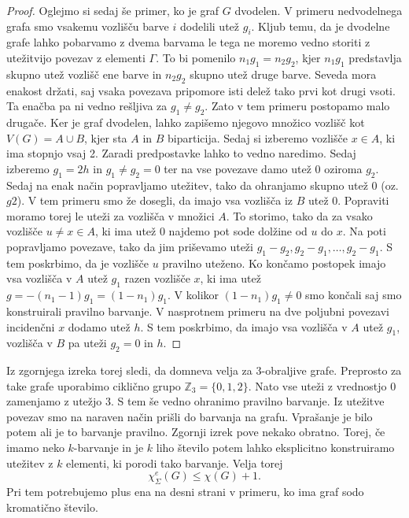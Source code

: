 \documentclass[12pt,a4paper,twoside]{article}
\theoremstyle{definition} %
\theoremstyle{plain} %
\newcommand{\ec}{\chi_{\Sigma}^e}
\numberwithin{equation}{section}  %
\begin{document}
\begin{proof}
	Oglejmo si sedaj še primer, ko je graf $G$ dvodelen. V primeru nedvodelnega grafa smo vsakemu vozlišču barve $i$ dodelili utež $g_i$. Kljub temu, da je dvodelne grafe lahko pobarvamo z dvema barvama le tega ne moremo vedno storiti z utežitvijo povezav z elementi $\Gamma$. To bi pomenilo $n_1 g_1 = n_2 g_2$, kjer $n_1 g_1$ predstavlja skupno utež vozlišč ene barve in $n_2 g_2$ skupno utež druge barve. Seveda mora enakost držati, saj vsaka povezava pripomore isti delež tako prvi kot drugi vsoti. Ta enačba pa ni vedno rešljiva za $g_1 \neq g_2$. Zato v tem primeru postopamo malo drugače. Ker je graf dvodelen, lahko zapišemo njegovo množico vozlišč kot $V(G) = A \cup B$, kjer sta $A$ in $B$ biparticija. Sedaj si izberemo vozlišče $x \in A$, ki ima stopnjo vsaj 2. Zaradi predpostavke lahko to vedno naredimo. Sedaj izberemo $g_1 = 2h$ in $g_1 \neq g_2 = 0$ ter na vse povezave damo utež 0 oziroma $g_2$. Sedaj na enak način popravljamo utežitev, tako da ohranjamo skupno utež 0 (oz. $g2$). V tem primeru smo že dosegli, da imajo vsa vozlišča iz $B$ utež 0. Popraviti moramo torej le uteži za vozlišča v množici $A$. To storimo, tako da za vsako vozlišče $u \neq x \in A$, ki ima utež 0 najdemo pot sode dolžine od $u$ do $x$. Na poti popravljamo povezave, tako da jim priševamo uteži $g_1 - g_2, g_2 - g_1, \ldots, g_2 - g_1$. S tem poskrbimo, da je vozlišče $u$ pravilno uteženo. Ko končamo postopek imajo vsa vozlišča v $A$ utež $g_1$ razen vozlišče $x$, ki ima utež $g = -(n_1 - 1) g_1 = (1 - n_1) g_1$. V kolikor $(1 - n_1)g_1 \neq 0$ smo končali saj smo konstruirali pravilno barvanje. V nasprotnem primeru na dve poljubni povezavi incidenčni $x$ dodamo utež $h$. S tem poskrbimo, da imajo vsa vozlišča v $A$ utež $g_1$, vozlišča v $B$ pa uteži $g_2 = 0$ in $h$.
\end{proof}

Iz zgornjega izreka torej sledi, da domneva velja za $3$-obraljive grafe. Preprosto za take grafe uporabimo ciklično grupo $\mathbb{Z}_3 = \{0,1,2\}$. Nato vse uteži z vrednostjo $0$ zamenjamo z utežjo $3$. S tem še vedno ohranimo pravilno barvanje. Iz utežitve povezav smo na naraven način prišli do barvanja na grafu. Vprašanje je bilo potem ali je to barvanje pravilno. Zgornji izrek pove nekako obratno. Torej, če imamo neko $k$-barvanje in je $k$ liho število potem lahko eksplicitno konstruiramo utežitev z $k$ elementi, ki porodi tako barvanje. Velja torej
$$ \ec(G) \le \chi(G) + 1.$$
Pri tem potrebujemo plus ena na desni strani v primeru, ko ima graf sodo kromatično število.
\end{document}
